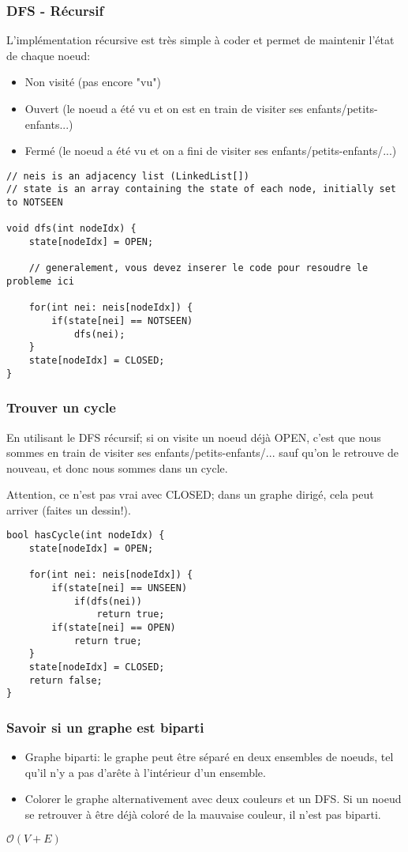\documentclass[8pt,aspectratio=169]{beamer}
\begin{document}
\begin{frame}[fragile]
\frametitle{DFS - Récursif}
L'implémentation récursive est très simple à coder et permet de maintenir l'état de chaque noeud:
\begin{itemize}
	\item Non visité (pas encore "vu")
	\item Ouvert (le noeud a été vu et on est en train de visiter ses enfants/petits-enfants...)
	\item Fermé (le noeud a été vu et on a fini de visiter ses enfants/petits-enfants/...)
\end{itemize}

\begin{lstlisting}
// neis is an adjacency list (LinkedList[])
// state is an array containing the state of each node, initially set to NOTSEEN

void dfs(int nodeIdx) {
	state[nodeIdx] = OPEN;
	
	// generalement, vous devez inserer le code pour resoudre le probleme ici
	
	for(int nei: neis[nodeIdx]) {
		if(state[nei] == NOTSEEN)
			dfs(nei);
	}
	state[nodeIdx] = CLOSED;
}
\end{lstlisting}
\end{frame}

\begin{frame}[fragile]
\frametitle{Trouver un cycle}
En utilisant le DFS récursif; si on visite un noeud déjà OPEN, c'est que nous sommes en train de visiter ses enfants/petits-enfants/... sauf qu'on le retrouve de nouveau, et donc nous sommes dans un cycle.

Attention, ce n'est pas vrai avec CLOSED; dans un graphe dirigé, cela peut arriver (faites un dessin!).

\begin{lstlisting}
bool hasCycle(int nodeIdx) {
	state[nodeIdx] = OPEN;

	for(int nei: neis[nodeIdx]) {
		if(state[nei] == UNSEEN)
			if(dfs(nei))
				return true;
		if(state[nei] == OPEN)
			return true;
	}
	state[nodeIdx] = CLOSED;
	return false;
}
\end{lstlisting}
\end{frame}

\begin{frame}
\frametitle{Savoir si un graphe est biparti}
\begin{itemize}
	\item Graphe biparti: le graphe peut être séparé en deux ensembles de noeuds, tel qu'il n'y a pas d'arête à l'intérieur d'un ensemble.
	\item Colorer le graphe alternativement avec deux couleurs et un DFS. Si un noeud se retrouver à être déjà coloré de la mauvaise couleur, il n'est pas biparti.
\end{itemize}
$\mathcal{O}(V+E)$
\end{frame}
\end{document}
